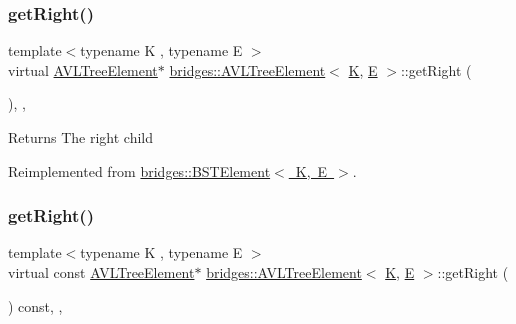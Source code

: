 \subsubsection{\texorpdfstring{getRight()}{getRight()}\hspace{0.1cm}{\footnotesize\ttfamily [1/2]}}
{\footnotesize\ttfamily template$<$typename K , typename E $>$ \\
virtual \mbox{\hyperlink{classbridges_1_1_a_v_l_tree_element}{A\+V\+L\+Tree\+Element}}$\ast$ \mbox{\hyperlink{classbridges_1_1_a_v_l_tree_element}{bridges\+::\+A\+V\+L\+Tree\+Element}}$<$ \mbox{\hyperlink{namespacebridges_acfb0a4f7877d8f63de3e6862004c50edaa5f3c6a11b03839d46af9fb43c97c188}{K}}, \mbox{\hyperlink{namespacebridges_acfb0a4f7877d8f63de3e6862004c50eda3a3ea00cfc35332cedf6e5e9a32e94da}{E}} $>$\+::get\+Right (\begin{DoxyParamCaption}{ }\end{DoxyParamCaption})\hspace{0.3cm}{\ttfamily [inline]}, {\ttfamily [override]}, {\ttfamily [virtual]}}

\begin{DoxyReturn}{Returns}
The right child 
\end{DoxyReturn}


Reimplemented from \mbox{\hyperlink{classbridges_1_1_b_s_t_element_a35e93bce32de933522dccde5f2b5ffd9}{bridges\+::\+B\+S\+T\+Element$<$ K, E $>$}}.

\mbox{\label{classbridges_1_1_a_v_l_tree_element_a2f6fd127f3a04fcc5be60299b7d98f12}} 
\subsubsection{\texorpdfstring{getRight()}{getRight()}\hspace{0.1cm}{\footnotesize\ttfamily [2/2]}}
{\footnotesize\ttfamily template$<$typename K , typename E $>$ \\
virtual const \mbox{\hyperlink{classbridges_1_1_a_v_l_tree_element}{A\+V\+L\+Tree\+Element}}$\ast$ \mbox{\hyperlink{classbridges_1_1_a_v_l_tree_element}{bridges\+::\+A\+V\+L\+Tree\+Element}}$<$ \mbox{\hyperlink{namespacebridges_acfb0a4f7877d8f63de3e6862004c50edaa5f3c6a11b03839d46af9fb43c97c188}{K}}, \mbox{\hyperlink{namespacebridges_acfb0a4f7877d8f63de3e6862004c50eda3a3ea00cfc35332cedf6e5e9a32e94da}{E}} $>$\+::get\+Right (\begin{DoxyParamCaption}{ }\end{DoxyParamCaption}) const\hspace{0.3cm}{\ttfamily [inline]}, {\ttfamily [override]}, {\ttfamily [virtual]}}

